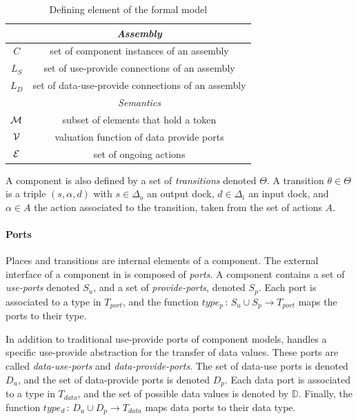 {\begin{table}[tp]
{\begin{tabular}{|c|c|}
      \hline
      \hline
      & \emph{Assembly}\\
      \hline
      $C$ & set of component instances of an assembly\\
      $L_S$ & set of use-provide connections of an assembly\\
      $L_D$ & set of data-use-provide connections of an assembly\\
      \hline
      \hline
      & \emph{Semantics}\\
      \hline
      $\mathcal{M}$ & subset of elements that hold a token\\
      $\mathcal{V}$ & valuation function of data provide ports\\
      $\mathcal{E}$ & set of ongoing actions \\
      \hline
    \end{tabular}
  }
  \caption{Defining element of the \mad formal model}
  \label{tab:not}
\end{table}
A component is also defined by a set of \emph{transitions} denoted
$\Theta$. A transition $\theta \in \Theta$ is a triple
$\left(s, \alpha, d\right)$ with $s\in\Delta_{o}$ an output dock,
$d\in\Delta_{i}$ an input dock, and $\alpha \in A$ the action
associated to the transition, taken from the set of actions $A$.
}

\paragraph{Ports}{

Places and transitions are internal elements of a \mad component.
The external interface of a component in \mad is
composed of \emph{ports}. A component contains a set of \emph{use-ports}
denoted $S_{u}$, and a set of \emph{provide-ports}, denoted
$S_{p}$. Each port is associated to a type in $T_{port}$, and the
function $type_{p}\,:\,S_{u}\cup S_{p}\rightarrow T_{port}$ maps the ports
to their type. 

In addition to traditional use-provide ports of component models,
\mad handles a specific use-provide abstraction for the
transfer of data values. These ports are called \emph{data-use-ports}
and \emph{data-provide-ports}. The set of data-use ports is denoted
$D_{u}$, and the set of data-provide ports is denoted
$D_{p}$. Each data port is associated to a type in $T_{data}$,
and the set of possible data values is denoted
by $\mathbb{D}$. Finally, the function $type_{d}\,:\,D_{u}\cup
D_{p}\rightarrow T_{data}$ maps data ports to their data type.
  
}

